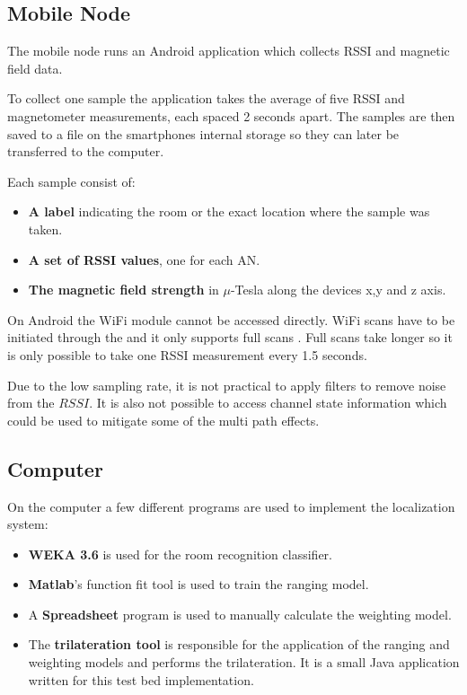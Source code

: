 \subsection{Mobile Node}

The mobile node runs an Android application which collects RSSI and magnetic field data.

To collect one sample the application takes the average of five RSSI and magnetometer measurements, each spaced 2 seconds apart. The samples are then saved to a  file on the smartphones internal storage so they can later be transferred to the computer.

Each sample consist of:
\begin{itemize}
\item \textbf{A label} indicating the room or the exact location where the sample was taken.
\item \textbf{A set of RSSI values}, one for each AN.
\item \textbf{The magnetic field strength} in \(\mu\)-Tesla along the devices x,y and z axis.
\end{itemize}

On Android the WiFi module cannot be accessed directly. WiFi scans have to be initiated through the  and it only supports full scans \cite{brouwers2014incremental}. Full scans take longer so it is only possible to take one RSSI measurement every 1.5 seconds.

Due to the low sampling rate, it is not practical to apply filters to remove noise from the $RSSI$. It is also not possible to access channel state information which could be used to mitigate some of the multi path effects.

\subsection{Computer}

On the computer a few different programs are used to implement the localization system:
\begin{itemize}
\item \textbf{WEKA 3.6} is used for the room recognition classifier.

\item \textbf{Matlab}'s function fit tool is used to train the ranging model.

\item A \textbf{Spreadsheet} program is used to manually calculate the weighting model.


\item The \textbf{trilateration tool} \cite{trilaterationTool} is responsible for the application of the ranging and weighting models and performs the trilateration. It is a small Java application written for this test bed implementation.

\end{itemize}

